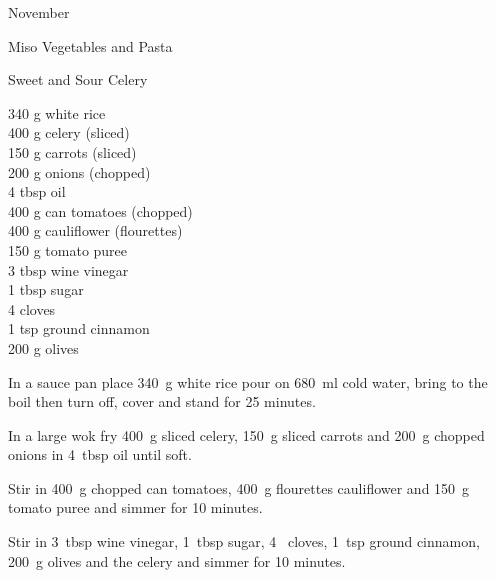 \begin{menu}{November}
\begin{recipe}{2}{Miso Vegetables and Pasta}
\begin{instructions}
    \end{instructions}
    \end{recipe}%
  
    \begin{recipe}{2}{Sweet and Sour Celery}%
		\begin{ingredients}
		340 g white rice  \\
	400 g celery (sliced) \\
	150 g carrots (sliced) \\
	200 g onions (chopped) \\
	4 tbsp oil  \\
	400 g can tomatoes (chopped) \\
	400 g cauliflower (flourettes) \\
	150 g tomato puree  \\
	3 tbsp wine vinegar  \\
	1 tbsp sugar  \\
	4  cloves  \\
	1 tsp ground cinnamon  \\
	200 g olives  \\
	
		\end{ingredients}
	
	
    \begin{instructions}
    \item 
    In a
    sauce pan
    place
    340~g  white rice
    pour on
    680~ml  cold water,
    bring to the boil then turn off, cover and stand for 25 minutes.
  \item 
        In a large wok fry
        400~g sliced celery,
        150~g sliced carrots
        and
        200~g chopped onions
        in
        4~tbsp  oil
        until soft.
      \item 
        Stir in
        400~g chopped can tomatoes,
        400~g flourettes cauliflower
        and
        150~g  tomato puree
        and simmer for 10 minutes.
      \item 
        Stir in
        3~tbsp  wine vinegar,
        1~tbsp  sugar,
        4~  cloves,
        1~tsp  ground cinnamon,
        200~g  olives
        and the celery
        and simmer for 10 minutes.
      
    \end{instructions}
    \end{recipe}%
  

\end{menu}
